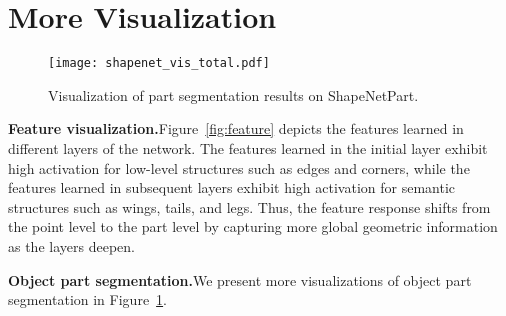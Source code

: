 \documentclass[preprint,12pt]{elsarticle}
\begin{document}
\section{More Visualization}
\label{sec:vis}

\begin{figure}[t]
\begin{center}
\texttt{[image: shapenet\_vis\_total.pdf]}
\end{center}
\vspace{-0.1cm}
\caption{Visualization of part segmentation results on ShapeNetPart.
}
\label{fig:shapenet}
\end{figure}


\noindent\textbf{Feature visualization.}\hspace{0.3cm}Figure~\ref{fig:feature} depicts the features learned in different layers of the network. The features learned in the initial layer exhibit high activation for low-level structures such as edges and corners, while the features learned in subsequent layers exhibit high activation for semantic structures such as wings, tails, and legs. Thus, the feature response shifts from the point level to the part level by capturing more global geometric information as the layers deepen.

\medskip
\noindent\textbf{Object part segmentation.}\hspace{0.3cm}We present more visualizations of object part segmentation in Figure~\ref{fig:shapenet}.

\clearpage




\end{document}
